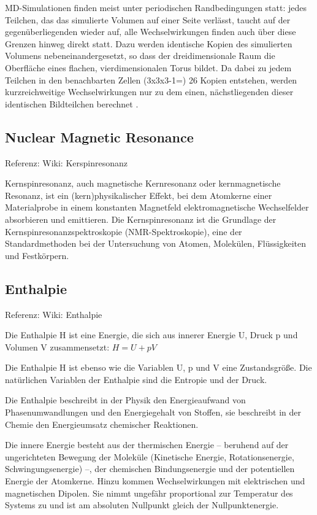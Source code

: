 \documentclass[]{article}
\begin{document}
MD-Simulationen finden meist unter periodischen Randbedingungen statt: jedes Teilchen, das das simulierte Volumen auf einer Seite verlässt, taucht auf der gegenüberliegenden wieder auf, alle Wechselwirkungen finden auch über diese Grenzen hinweg direkt statt. Dazu werden identische Kopien des simulierten Volumens nebeneinandergesetzt, so dass der dreidimensionale Raum die Oberfläche eines flachen, vierdimensionalen Torus bildet. Da dabei zu jedem Teilchen in den benachbarten Zellen (3x3x3-1=) 26 Kopien entstehen, werden kurzreichweitige Wechselwirkungen nur zu dem einen, nächstliegenden dieser identischen Bildteilchen berechnet .

\subsection{Nuclear Magnetic Resonance}
Referenz: Wiki: Kerspinresonanz

Kernspinresonanz, auch magnetische Kernresonanz oder kernmagnetische Resonanz, ist ein (kern)physikalischer Effekt, bei dem Atomkerne einer Materialprobe in einem konstanten Magnetfeld elektromagnetische Wechselfelder absorbieren und emittieren.  Die Kernspinresonanz ist die Grundlage der Kernspinresonanzspektroskopie (NMR-Spektroskopie), eine der Standardmethoden bei der Untersuchung von Atomen, Molekülen, Flüssigkeiten und Festkörpern. 

\subsection{Enthalpie}
Referenz: Wiki: Enthalpie

Die Enthalpie H  ist eine Energie, die sich aus innerer Energie U, Druck p und Volumen V zusammensetzt:
$H = U + pV$

Die Enthalpie H ist ebenso wie die Variablen U, p und V eine Zustandsgröße. Die natürlichen Variablen der Enthalpie sind die Entropie und der Druck.

Die Enthalpie beschreibt in der Physik  den Energieaufwand von Phasenumwandlungen und den Energiegehalt von Stoffen, sie beschreibt in der Chemie den Energieumsatz chemischer Reaktionen.

Die innere Energie besteht aus der thermischen Energie – beruhend auf der ungerichteten Bewegung der Moleküle (Kinetische Energie, Rotationsenergie, Schwingungsenergie) –, der chemischen Bindungsenergie und der potentiellen Energie der Atomkerne. Hinzu kommen Wechselwirkungen mit elektrischen und magnetischen Dipolen. Sie nimmt ungefähr proportional zur Temperatur des Systems zu und ist am absoluten Nullpunkt gleich der Nullpunktenergie.
\end{document}
